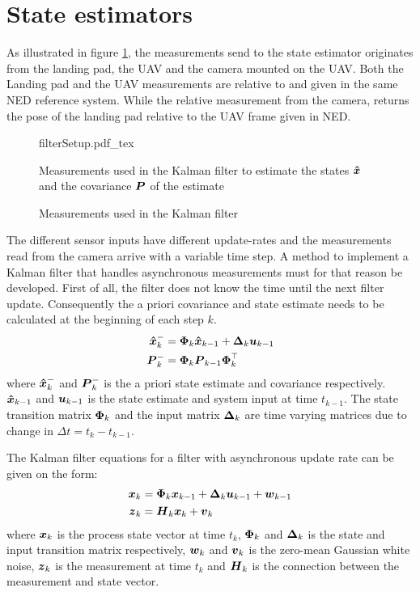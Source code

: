 


\section{State estimators}\label{sec:stateEstimation}
As illustrated in figure \ref{fig:filterSetup}, the measurements send to the state estimator originates from the landing pad, the UAV and the camera mounted on the UAV. Both the Landing pad and the UAV measurements are relative to and given in the same NED reference system. While the relative measurement from the camera, returns the pose of the landing pad relative to the UAV frame given in NED.

\begin{figure}[ht]
	\begin{center}
		\centering
        {filterSetup.pdf_tex}
        \caption{Measurements used in the Kalman filter}{Measurements used in the Kalman filter to estimate the states $\boldsymbol{\hat{x}}$ and the covariance $\boldsymbol{P}$ of the estimate}
        \label{fig:filterSetup}
	\end{center}
\end{figure}

The different sensor inputs have different update-rates and the measurements read from the camera arrive with a variable time step. A method to implement a Kalman filter that handles asynchronous measurements must for that reason be developed. First of all, the filter does not know the time until the next filter update. Consequently the a priori covariance and state estimate needs to be calculated at the beginning of each step $k$.
\begin{align}
    \boldsymbol{\hat{x}}^{-}_{k}&=\boldsymbol{\Phi}_{k} \boldsymbol{\hat{x}}_{k-1}+\boldsymbol{\Delta}_{k} \boldsymbol{u}_{k-1} \\
    \boldsymbol{P}^{-}_{k}&=\boldsymbol{\Phi}_{k}\boldsymbol{P}_{k-1}\boldsymbol{\Phi}_{k}^{\top}
\end{align}
where $\boldsymbol{\hat{x}}^{-}_{k}$ and $\boldsymbol{P}^{-}_{k}$ is the a priori state estimate and covariance respectively. $\boldsymbol{\hat{x}}_{k-1}$ and $\boldsymbol{u}_{k-1}$ is the state estimate and system input at time $t_{k-1}$. The state transition matrix $\boldsymbol{\Phi}_k$ and the input matrix $\boldsymbol{\Delta}_{k}$ are time varying matrices due to change in $\Delta t=t_k-t_{k-1}$. 

The Kalman filter equations for a filter with asynchronous update rate can be given on the form:
\begin{align}
  \boldsymbol{x}_{k}&=\boldsymbol{\Phi}_{k} \boldsymbol{x}_{k-1} + \boldsymbol{\Delta}_{k} \boldsymbol{u}_{k-1} + \boldsymbol{w}_{k-1}\nonumber\\
  \boldsymbol{z}_k&=\boldsymbol{H}_k \boldsymbol{x}_k+\boldsymbol{v}_k\label{eq:kf1}
\end{align}
where $\boldsymbol{x}_k$ is the process state vector at time $t_k$, $\boldsymbol{\Phi}_k$ and $\boldsymbol{\Delta}_k$ is the state and input transition matrix respectively, $\boldsymbol{w}_k$ and $\boldsymbol{v}_k$ is the zero-mean Gaussian white noise, $\boldsymbol{z}_k$ is the 
measurement at time $t_k$ and $\boldsymbol{H}_k$ is the connection between the measurement and state vector.

